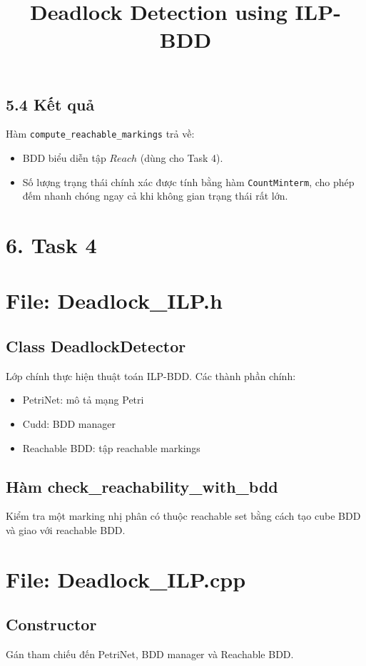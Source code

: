 \documentclass[12pt,a4paper]{article}
\begin{document}
\subsection*{5.4 Kết quả}
Hàm \texttt{compute\_reachable\_markings} trả về:
\begin{itemize}
    \item BDD biểu diễn tập $Reach$ (dùng cho Task 4).
    \item Số lượng trạng thái chính xác được tính bằng hàm \texttt{CountMinterm}, cho phép đếm nhanh chóng ngay cả khi không gian trạng thái rất lớn.
\end{itemize}

\section*{6. Task 4}
\title{Deadlock Detection using ILP-BDD}
\section{File: Deadlock\_ILP.h}
\subsection{Class DeadlockDetector}
Lớp chính thực hiện thuật toán ILP-BDD. Các thành phần chính:
\begin{itemize}
\item PetriNet: mô tả mạng Petri
\item Cudd: BDD manager
\item Reachable BDD: tập reachable markings
\end{itemize}


\subsection{Hàm check\_reachability\_with\_bdd}
Kiểm tra một marking nhị phân có thuộc reachable set bằng cách tạo cube BDD và giao với reachable BDD.


\section{File: Deadlock\_ILP.cpp}


\subsection{Constructor}
Gán tham chiếu đến PetriNet, BDD manager và Reachable BDD.
\end{document}
